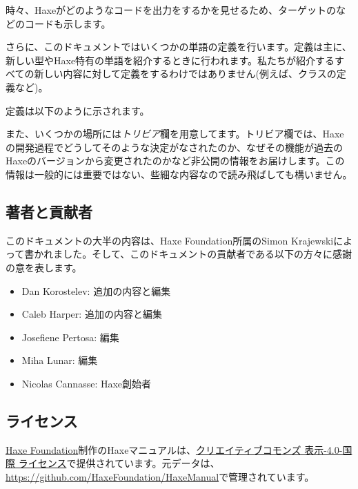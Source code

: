 時々、Haxeがどのようなコードを出力をするかを見せるため、ターゲットのなどのコードも示します。

さらに、このドキュメントではいくつかの単語の定義を行います。定義は主に、新しい型やHaxe特有の単語を紹介するときに行われます。私たちが紹介するすべての新しい内容に対して定義をするわけではありません(例えば、クラスの定義など)。

定義は以下のように示されます。


また、いくつかの場所には\emph{トリビア}欄を用意してます。トリビア欄では、Haxeの開発過程でどうしてそのような決定がなされたのか、なぜその機能が過去のHaxeのバージョンから変更されたのかなど非公開の情報をお届けします。この情報は一般的には重要ではない、些細な内容なので読み飛ばしても構いません。


\subsection{著者と貢献者}
\label{introduction-authors-and-contributions}

このドキュメントの大半の内容は、Haxe Foundation所属のSimon Krajewskiによって書かれました。そして、このドキュメントの貢献者である以下の方々に感謝の意を表します。

\begin{itemize}
	\item Dan Korostelev: 追加の内容と編集
	\item Caleb Harper: 追加の内容と編集
	\item Josefiene Pertosa: 編集
	\item Miha Lunar: 編集
	\item Nicolas Cannasse: Haxe創始者
\end{itemize}

\subsection{ライセンス}
\label{introduction-license}

\href{http://haxe.org/foundation}{Haxe Foundation}制作のHaxeマニュアルは、\href{http://creativecommons.org/licenses/by/4.0/}{クリエイティブコモンズ 表示-4.0-国際 ライセンス}で提供されています。元データは、\href{https://github.com/HaxeFoundation/HaxeManual}{https://github.com/HaxeFoundation/HaxeManual}で管理されています。

